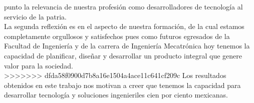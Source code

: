 punto la relevancia de nuestra profesi\'on como desarrolladores de tecnolog\'ia
al servicio de la patria.\\
La segunda reflexi\'on es en el aspecto de nuestra formaci\'on, de la cual
estamos completamente orgullosos y satisfechos pues como futuros egresados de la
Facultad de Ingenier\'ia y de la carrera de Ingenier\'ia Mecatr\'onica hoy
tenemos la capacidad de planificar, diseñar y desarrollar un producto integral
que genere valor para la sociedad.\\
>>>>>>> dfda58f0900d7b8a16e1504a4ace11c641cf209c
Los resultados obtenidos en este trabajo nos motivan a creer que tenemos la capacidad para desarrollar tecnolog\'ia y soluciones ingenieriles cien por ciento mexicanas.
